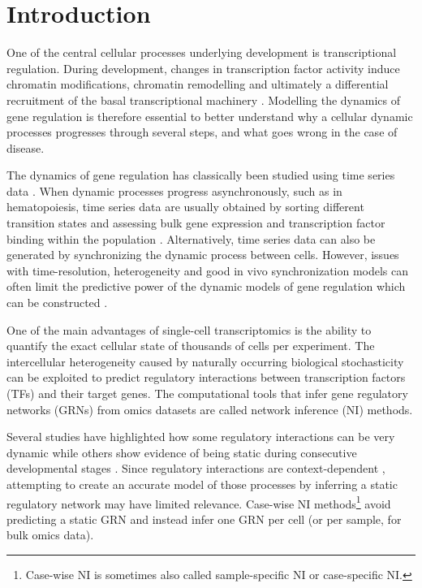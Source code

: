 
\section{Introduction}

One of the central cellular processes underlying development is transcriptional regulation. During development, changes in transcription factor activity induce chromatin modifications, chromatin remodelling and ultimately a differential recruitment of the basal transcriptional machinery \cite{coulon_eukaryotictranscriptionaldynamics_2013}. Modelling the dynamics of gene regulation is therefore essential to better understand why a cellular dynamic processes progresses through several steps, and what goes wrong in the case of disease.

The dynamics of gene regulation has classically been studied using time series data \cite{bar-joseph_studyingmodellingdynamic_2012}. When dynamic processes progress asynchronously, such as in hematopoiesis, time series data are usually obtained by sorting different transition states and assessing bulk gene expression and transcription factor binding within the population \cite{novershtern_denselyinterconnectedtranscriptional_2011, may_dynamicanalysisgene_2013, jojic_identificationtranscriptionalregulators_2013, goode_dynamicgeneregulatory_2016}. Alternatively, time series data can also be generated by synchronizing the dynamic process between cells. However, issues with time-resolution, heterogeneity and good in vivo synchronization models can often limit the predictive power of the dynamic models of gene regulation which can be constructed \cite{bar-joseph_studyingmodellingdynamic_2012}.

One of the main advantages of single-cell transcriptomics is the ability to quantify the exact cellular state of thousands of cells per experiment. The intercellular heterogeneity caused by naturally occurring biological stochasticity \cite{padovan-merhar_usingvariabilitygene_2013} can be exploited to predict regulatory interactions between transcription factors (TFs) and their target genes. The computational tools that infer gene regulatory networks (GRNs) from omics datasets are called network inference (NI) methods.

Several studies have highlighted how some regulatory interactions can be very dynamic while others show evidence of being static during consecutive developmental stages \cite{moignard_characterizationtranscriptionalnetworks_2013, pina_singlecellnetworkanalysis_2015}. 
Since regulatory interactions are context-dependent \cite{papp_genomewideanalysiscontextdependence_2005}, attempting to create an accurate model of those processes by inferring a static regulatory network may have limited relevance.
Case-wise NI methods\footnote{Case-wise NI is sometimes also called sample-specific NI or case-specific NI.} avoid predicting a static GRN and instead infer one GRN per cell (or per sample, for bulk omics data).

